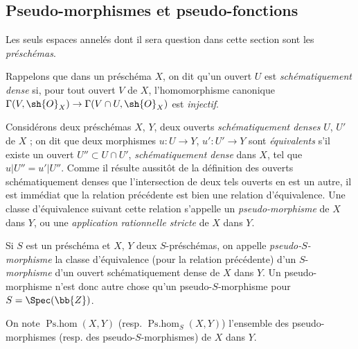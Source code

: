 \subsection{Pseudo-morphismes et pseudo-fonctions}

Les seuls espaces annelés dont il sera question dans cette section sont les \emph{préschémas}.

\begin{env}[20.2.1]
Rappelons  que dans un préschéma $X$, on dit qu'un ouvert $U$ est \emph{schématiquement dense} si, pour tout ouvert $V$ de $X$, l'homomorphisme canonique $\Gamma(V,\sh{O}_X)\to\Gamma(V\cap U,\sh{O}_X)$ est \emph{injectif}.

Considérons deux préschémas $X$, $Y$, deux ouverts \emph{schématiquement denses} $U$, $U'$ de $X$ ; on dit que deux morphismes $u:U\to Y$, $u':U'\to Y$ sont \emph{équivalents} s'il existe un ouvert $U''\subset U\cap U'$, \emph{schématiquement dense} dans $X$, tel que $u|U''=u'|U''$.
Comme il résulte aussitôt de la définition des ouverts schématiquement denses que l'intersection de deux tels ouverts en est un autre, il est immédiat que la relation précédente est bien une relation d'équivalence.
Une classe d'équivalence suivant cette relation s'appelle un \emph{pseudo-morphisme} de $X$ dans $Y$, ou une \emph{application rationnelle stricte} de $X$ dans $Y$.

Si $S$ est un préschéma et $X$, $Y$ deux $S$-préschémas, on appelle \emph{pseudo-$S$-morphisme} la classe d'équivalence (pour la relation précédente) d'un $S$-\emph{morphisme} d'un ouvert schématiquement dense de $X$ dans $Y$.
Un pseudo-morphisme n'est donc autre chose qu'un pseudo-$S$-morphisme pour $S=\Spec(\bb{Z})$.

On note $\operatorname{Ps.hom}(X,Y)$ (resp. $\operatorname{Ps.hom}_S(X,Y)$) l'ensemble des pseudo-morphismes (resp. des pseudo-$S$-morphismes) de $X$ dans $Y$.
\end{env}

